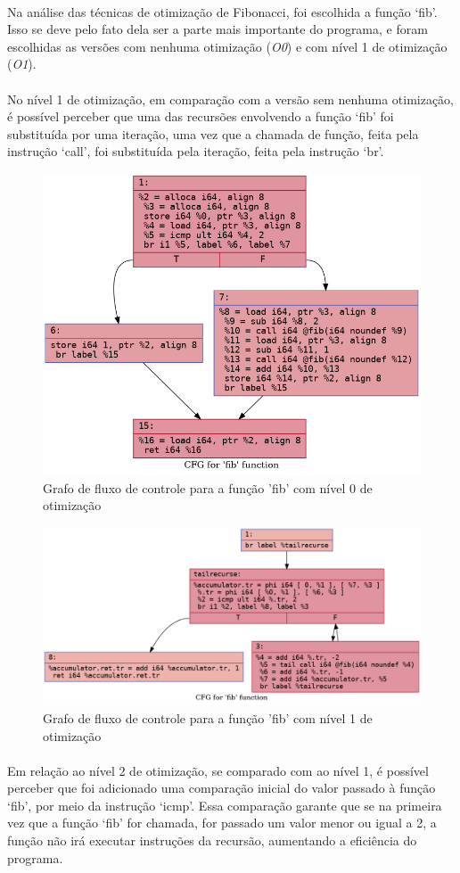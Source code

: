 \documentclass[12pt]{article}
\begin{document}
\paragraph{}Na análise das técnicas de otimização de Fibonacci, foi escolhida a função ‘fib’. Isso se deve pelo fato dela ser a parte mais importante do programa, e foram escolhidas as versões com nenhuma otimização (\textit{O0}) e com nível 1 de otimização (\textit{O1}).

\paragraph{}No nível 1 de otimização, em comparação com a versão sem nenhuma otimização, é possível perceber que uma das recursões envolvendo a função ‘fib’ foi substituída por uma iteração, uma vez que a chamada de função, feita pela instrução ‘call’, foi substituída pela iteração, feita pela instrução ‘br’.

\begin{figure}
    \centering
    \includegraphics[width=0.5\linewidth]{fib2_.fib_O0.png}
    \caption{Grafo de fluxo de controle para a função 'fib' com nível 0 de otimização}
\end{figure}

\begin{figure}
    \centering
    \includegraphics[width=0.5\linewidth]{fib2_.fib_O1.png}
    \caption{Grafo de fluxo de controle para a função 'fib' com nível 1 de otimização}
\end{figure}

\paragraph{}Em relação ao nível 2 de otimização, se comparado com ao nível 1, é possível perceber que foi adicionado uma comparação inicial do valor passado à função ‘fib’, por meio da instrução ‘icmp’. Essa comparação garante que se na primeira vez que a função ‘fib’ for chamada, for passado um valor menor ou igual a 2, a função não irá executar instruções da recursão, aumentando a eficiência do programa.
\end{document}
